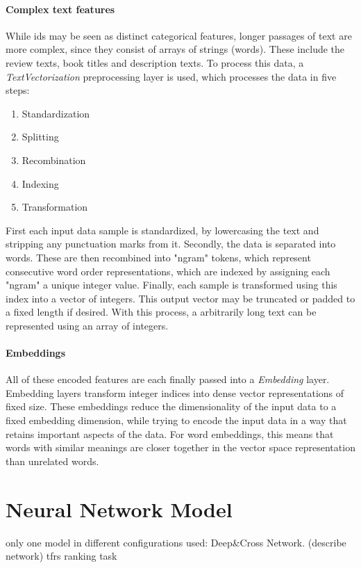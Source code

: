 \documentclass[10pt,final,journal,a4paper,oneside,twocolumn]{IEEEtran}
\begin{document}
\paragraph{Complex text features}
While ids may be seen as distinct categorical features, longer passages of text are more complex, since they consist of arrays of strings (words). These include the review texts, book titles and description texts. To process this data, a \emph{TextVectorization} preprocessing layer is used, which processes the data in five steps:
\begin{enumerate}
    \item Standardization
    \item Splitting
    \item Recombination
    \item Indexing
    \item Transformation
\end{enumerate}
First each input data sample is standardized, by lowercasing the text and stripping any punctuation marks from it. Secondly, the data is separated into words. These are then recombined into "ngram" tokens, which represent consecutive word order representations, which are indexed by assigning each "ngram" a unique integer value. Finally, each sample is transformed using this index into a vector of integers.
This output vector may be truncated or padded to a fixed length if desired.
With this process, a arbitrarily long text can be represented using an array of integers.

\paragraph{Embeddings}
All of these encoded features are each finally passed into a \emph{Embedding} layer. 
Embedding layers transform integer indices into dense vector representations of fixed size. These embeddings reduce the dimensionality of the input data to a fixed embedding dimension, while trying to encode the input data in a way that retains important aspects of the data. For word embeddings, this means that words with similar meanings are closer together in the vector space representation than unrelated words.



\section{Neural Network Model}
only one model in different configurations used: Deep\&Cross Network.
(describe network)
tfrs ranking task
\end{document}
